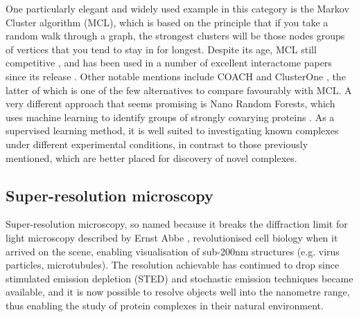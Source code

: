 \documentclass[a4paper,11pt,twoside,openright]{scrbook}
\begin{document}
One particularly elegant and widely used example in this category is the Markov Cluster algorithm \cite{VanDongen2000} (MCL), which is based on the principle that if you take a random walk through a graph, the strongest clusters will be those nodes groups of vertices that you tend to stay in for longest. Despite its age, MCL still competitive \cite{Li2010}, and has been used in a number of excellent interactome papers since its release \cite{Krogan2006,Wan2015}. Other notable mentions include COACH and ClusterOne \cite{Wu2009,Nepusz2012}, the latter of which is one of the few alternatives to compare favourably with MCL. A very different approach that seems promising is Nano Random Forests, which uses machine learning to identify groups of strongly covarying proteins \cite{Montano-Gutierrez2017}. As a supervised learning method, it is well suited to investigating known complexes under different experimental conditions, in contrast to those previously mentioned, which are better placed for discovery of novel complexes.

\subsection{Super-resolution microscopy}
Super-resolution microscopy, so named because it breaks the diffraction limit for light microscopy described by Ernst Abbe \cite{Abbe1873}, revolutionised cell biology when it arrived on the scene, enabling visualisation of sub-200nm structures (e.g. virus particles, microtubules). The resolution achievable has continued to drop since stimulated emission depletion \cite{Hell1994} (STED) and stochastic emission techniques \cite{Rust2006,Hess2006,Betzig2006} became available, and it is now possible to resolve objects well into the nanometre range, thus enabling the study of protein complexes in their natural environment.
\end{document}

